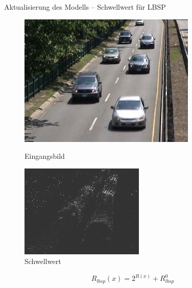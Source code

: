 \documentclass[hyperref={pdfpagelabels=false}]{beamer}
\begin{document}
\begin{frame}[t]{Aktualisierung des Modells -- Schwellwert für LBSP}
	\vspace{1.65em}
	\begin{figure}
		\centering
		\begin{minipage}{0.45\linewidth}
			\includegraphics[width=1\linewidth]{Abbildungen/Eingang3.jpg}
			\caption*{Eingangsbild}
		\end{minipage}
		\begin{minipage}{0.45\linewidth}
			\includegraphics[width=1\linewidth]{Abbildungen/R_lbsp.jpg}
			\caption*{Schwellwert}
		\end{minipage}
	\end{figure}
	\bigskip
	\begin{equation*}
		R_{lbsp}(x) = 2^{R(x)} + R^0_{lbsp} 	
	\end{equation*}
\end{frame}
\end{document}
